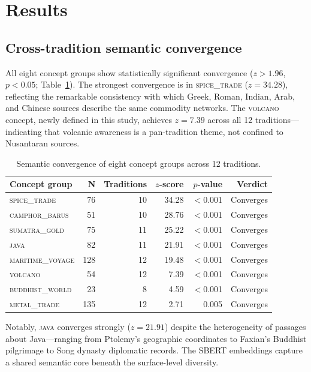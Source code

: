 \documentclass[12pt]{article}
\begin{document}
\section{Results}

\subsection{Cross-tradition semantic convergence}

All eight concept groups show statistically significant convergence ($z > 1.96$, $p < 0.05$; Table~\ref{tab:convergence}).
The strongest convergence is in \textsc{spice\_trade} ($z = 34.28$), reflecting the remarkable consistency with which Greek, Roman, Indian, Arab, and Chinese sources describe the same commodity networks.
The \textsc{volcano} concept, newly defined in this study, achieves $z = 7.39$ across all 12 traditions---indicating that volcanic awareness is a pan-tradition theme, not confined to Nusantaran sources.

\begin{table}[htbp]
\centering
\caption{Semantic convergence of eight concept groups across 12 traditions.}
\label{tab:convergence}
\begin{tabular}{lrrrrr}
\toprule
\textbf{Concept group} & \textbf{N} & \textbf{Traditions} & \textbf{$z$-score} & \textbf{$p$-value} & \textbf{Verdict} \\
\midrule
\textsc{spice\_trade}      & 76  & 10 & 34.28 & $<$0.001 & Converges \\
\textsc{camphor\_barus}    & 51  & 10 & 28.76 & $<$0.001 & Converges \\
\textsc{sumatra\_gold}     & 75  & 11 & 25.22 & $<$0.001 & Converges \\
\textsc{java}              & 82  & 11 & 21.91 & $<$0.001 & Converges \\
\textsc{maritime\_voyage}  & 128 & 12 & 19.48 & $<$0.001 & Converges \\
\textsc{volcano}           & 54  & 12 &  7.39 & $<$0.001 & Converges \\
\textsc{buddhist\_world}   & 23  &  8 &  4.59 & $<$0.001 & Converges \\
\textsc{metal\_trade}      & 135 & 12 &  2.71 & 0.005    & Converges \\
\bottomrule
\end{tabular}
\end{table}

Notably, \textsc{java} converges strongly ($z = 21.91$) despite the heterogeneity of passages about Java---ranging from Ptolemy's geographic coordinates to Faxian's Buddhist pilgrimage to Song dynasty diplomatic records.
The SBERT embeddings capture a shared semantic core beneath the surface-level diversity.
\end{document}
